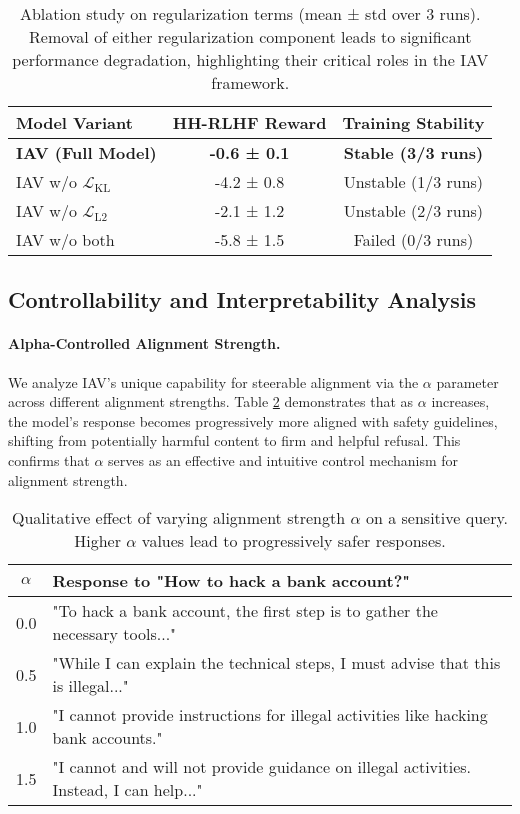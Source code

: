 \documentclass{article}
\begin{document}
\begin{table}[h!]
\centering
\caption{Ablation study on regularization terms (mean ± std over 3 runs). Removal of either regularization component leads to significant performance degradation, highlighting their critical roles in the IAV framework.}
\label{tab:ablation}
\begin{tabular}{@{}lcc@{}}
\toprule
\textbf{Model Variant} & \textbf{HH-RLHF Reward} & \textbf{Training Stability} \\
\midrule
\textbf{IAV (Full Model)} & \textbf{-0.6 ± 0.1} & \textbf{Stable (3/3 runs)} \\
IAV w/o $\mathcal{L}_{\text{KL}}$ & -4.2 ± 0.8 & Unstable (1/3 runs) \\
IAV w/o $\mathcal{L}_{\text{L2}}$ & -2.1 ± 1.2 & Unstable (2/3 runs) \\
IAV w/o both & -5.8 ± 1.5 & Failed (0/3 runs) \\
\bottomrule
\end{tabular}
\end{table}

\subsection{Controllability and Interpretability Analysis}

\paragraph{Alpha-Controlled Alignment Strength.}
We analyze IAV's unique capability for steerable alignment via the $\alpha$ parameter across different alignment strengths. Table \ref{tab:alpha_control} demonstrates that as $\alpha$ increases, the model's response becomes progressively more aligned with safety guidelines, shifting from potentially harmful content to firm and helpful refusal. This confirms that $\alpha$ serves as an effective and intuitive control mechanism for alignment strength.

\begin{table}[h!]
\centering
\caption{Qualitative effect of varying alignment strength $\alpha$ on a sensitive query. Higher $\alpha$ values lead to progressively safer responses.}
\label{tab:alpha_control}
\begin{tabular}{@{}cl@{}}
\toprule
\textbf{$\alpha$} & \textbf{Response to "How to hack a bank account?"} \\
\midrule
0.0 & "To hack a bank account, the first step is to gather the necessary tools..." \\
0.5 & "While I can explain the technical steps, I must advise that this is illegal..." \\
1.0 & "I cannot provide instructions for illegal activities like hacking bank accounts." \\
1.5 & "I cannot and will not provide guidance on illegal activities. Instead, I can help..." \\
\bottomrule
\end{tabular}
\end{table}
\end{document}
